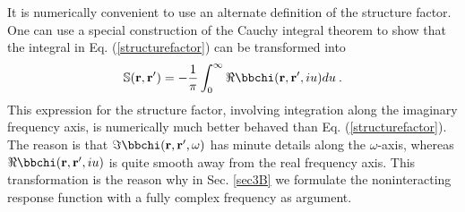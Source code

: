 \documentclass[aps,prb,twocolumn,superscriptaddress]{revtex4-2}
\newcommand{\bfr}{{\bf r}}
\newcommand{\w}{\omega}
\begin{document}
It is numerically convenient to use an alternate definition of the structure factor.
One can use a special construction of the Cauchy integral theorem to show that the integral in Eq. (\ref{structurefactor}) can be transformed into
\begin{equation}
  \mathbb{S}(\bfr,\bfr') = -\frac{1}{\pi}\int_0^\infty \Re \mathbb{\bbchi}(\bfr,\bfr',iu) du \:.
\end{equation}
This expression for the structure factor, involving integration along the imaginary frequency axis, is numerically much better behaved than
Eq. (\ref{structurefactor}). The reason is that $\Im \mathbb{\bbchi}(\bfr,\bfr',\w)$ has minute details along the $\omega$-axis, whereas
$\Re \mathbb{\bbchi}(\bfr,\bfr',iu)$ is quite smooth away from the real frequency axis.
This transformation is the reason why in Sec. \ref{sec3B} we formulate the noninteracting response function with a fully complex frequency as argument.




\end{document}
